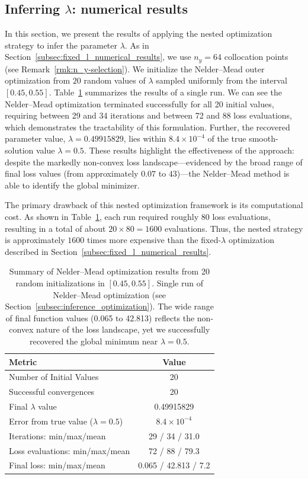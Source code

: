\documentclass[12pt]{article}
\theoremstyle{definition}\newtheorem{lemma}{Lemma}
\begin{document}
\subsection{Inferring $\lambda$: numerical results}\label{subsec:inference_numerical_results}

In this section, we present the results of applying the nested optimization strategy to infer the parameter $\lambda$. As in Section~\ref{subsec:fixed_l_numerical_results}, we use $n_y = 64$ collocation points (see Remark~\ref{rmk:n_y-selection}). We initialize the Nelder--Mead outer optimization from $20$ random values of $\lambda$ sampled uniformly from the interval $[0.45, 0.55]$. Table~\ref{tab:nelder_mead_results} summarizes the results of a single run. We can see the Nelder--Mead optimization terminated successfully for all 20 initial values, requiring between 29 and 34 iterations and between 72 and 88 loss evaluations, which demonstrates the tractability of this formulation. Further, the recovered parameter value, $\lambda = 0.49915829$, lies within $8.4 \times 10^{-4}$ of the true smooth-solution value $\lambda = 0.5$. These results highlight the effectiveness of the approach: despite the markedly non-convex loss landscape—evidenced by the broad range of final loss values (from approximately $0.07$ to $43$)—the Nelder--Mead method is able to identify the global minimizer.

The primary drawback of this nested optimization framework is its computational cost. As shown in Table~\ref{tab:nelder_mead_results}, each run required roughly 80 loss evaluations, resulting in a total of about $20 \times 80 = 1600$ evaluations. Thus, the nested strategy is approximately $1600$ times more expensive than the fixed-$\lambda$ optimization described in Section~\ref{subsec:fixed_l_numerical_results}.
\begin{table}[tbhp]
    \centering
    \begin{tabular}{lc}
        \toprule
        Metric & Value \\
        \midrule
        Number of Initial Values & 20 \\
        Successful convergences & 20 \\
        Final $\lambda$ value & 0.49915829 \\
        Error from true value ($\lambda = 0.5$) & $8.4 \times 10^{-4}$ \\
        \midrule
        Iterations: min/max/mean & 29 / 34 / 31.0 \\
        Loss evaluations: min/max/mean & 72 / 88 / 79.3 \\
        Final loss: min/max/mean & 0.065 / 42.813 / 7.2 \\
        \bottomrule
    \end{tabular}
    \caption{Summary of Nelder--Mead optimization results from 20 random 
    initializations in $[0.45, 0.55]$. Single run of Nelder--Mead optimization (see Section~\ref{subsec:inference_optimization}). The wide range of final function values (0.065 to 42.813) 
    reflects the non-convex nature of the loss landscape, yet we successfully
    recovered the global minimum near $\lambda = 0.5$.}
    \label{tab:nelder_mead_results}
\end{table}
\end{document}
